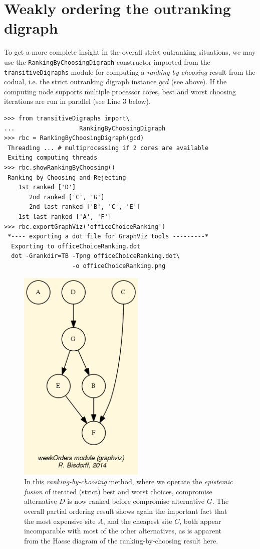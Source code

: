 \section{Weakly ordering the outranking digraph}
\label{sec:6.6}

To get a more complete insight in the overall strict outranking situations, we may use the \texttt{RankingByChoosingDigraph} constructor imported from the \texttt{transitiveDigraphs} module for computing a \emph{ranking-by-choosing} result from the codual, i.e. the strict outranking digraph instance $gcd$ (see above). If the computing node supports multiple processor cores, best and worst choosing iterations are run in parallel (see Line 3 below).
\begin{lstlisting}
>>> from transitiveDigraphs import\
...                  RankingByChoosingDigraph
>>> rbc = RankingByChoosingDigraph(gcd)
 Threading ... # multiprocessing if 2 cores are available
 Exiting computing threads
>>> rbc.showRankingByChoosing()
 Ranking by Choosing and Rejecting
    1st ranked ['D']
       2nd ranked ['C', 'G']
       2nd last ranked ['B', 'C', 'E']
    1st last ranked ['A', 'F']
>>> rbc.exportGraphViz('officeChoiceRanking')
 *---- exporting a dot file for GraphViz tools ---------*
  Exporting to officeChoiceRanking.dot
  dot -Grankdir=TB -Tpng officeChoiceRanking.dot\
                   -o officeChoiceRanking.png
\end{lstlisting}
\begin{figure}[h]
\sidecaption
\includegraphics[width=6cm]{Figures/officeChoiceRanking.png}
\caption{In this \emph{ranking-by-choosing} method, where we operate the \emph{epistemic fusion} of iterated (strict) best and worst choices, compromise alternative $D$ is now ranked before compromise alternative $G$. The overall partial ordering result shows again the important fact that the most expensive site $A$, and the cheapest site $C$, both appear incomparable with most of the other alternatives, as is apparent from the Hasse diagram of the ranking-by-choosing result here.} 
\label{fig:6.5}       %
\end{figure}
	   
